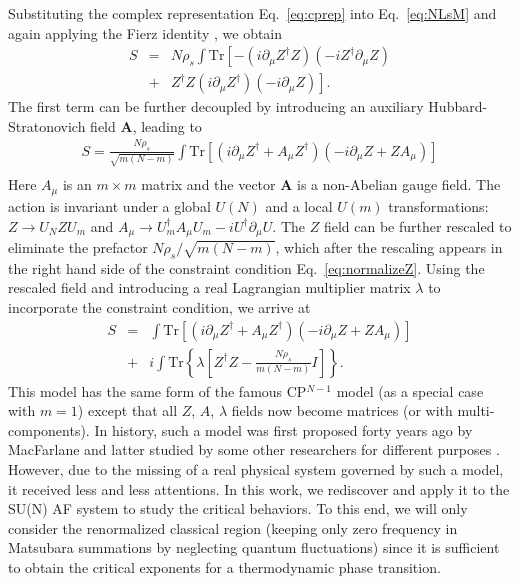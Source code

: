 \documentclass[aps,twocolumn,superscriptaddress]{revtex4-1}
\newcommand{\bea}{\begin{eqnarray}}
\newcommand{\eea}{\end{eqnarray}}
\newcommand{\bA}{\mathbf{A}}
\begin{document}
Substituting the complex representation Eq.~\ref{eq:cprep} into Eq.~\ref{eq:NLsM} and again applying the Fierz identity
, we obtain \bea S &=& N\rho_s \int\mathrm{Tr}\left[-(i\partial_\mu Z^\dagger Z) (-iZ^\dag \partial_\mu
Z) \right. \nonumber\\  &+& \left. Z^\dag Z (i\partial_\mu Z^\dagger)(-i\partial_\mu Z)\right] .\eea The first term can
be further decoupled by introducing an auxiliary Hubbard-Stratonovich field $\bA$, leading to \bea \label{eq:cpNm0} S=\frac{N\rho_s}{\sqrt{m(N-m)}}\int
\mathrm{Tr}\left[ (i\partial_\mu Z^\dag+A_\mu Z^\dag)(-i\partial_\mu Z+ZA_\mu)  \right] \nonumber\\ \eea 
Here $A_\mu$ is an $m\times m$ matrix and the vector $\bA$ is a non-Abelian gauge field. The action is invariant under a global $U(N)$ and a local $U(m)$ transformations: $Z\rightarrow U_NZU_m$ and $A_\mu\rightarrow U_m^\dag A_\mu U_m-iU^\dag\partial_\mu U$. \cite{macfarlane1979,duerksen1981}
The $Z$ field can be further rescaled to eliminate the prefactor
$N\rho_s/\sqrt{m(N-m)}$, which after the rescaling appears in the right hand side of the constraint condition Eq.~\ref{eq:normalizeZ}. Using the
rescaled field and introducing a real Lagrangian multiplier matrix $\lambda$ to incorporate the constraint condition, we
arrive at \bea \label{eq:cpNm} S&=&\int \mathrm{Tr}\left[ (i\partial_\mu Z^\dag+A_\mu Z^\dag)(-i\partial_\mu Z+ZA_\mu)
\right] \nonumber \\ &+& i\int \mathrm{Tr}\left\{\lambda\left[Z^\dag Z-\frac{N\rho_s}{m(N-m)}I\right]\right\} .
\eea 
This model has the same form of the famous CP$^{N-1}$ model (as a special case with $m=1$) except that all $Z$, $A$, $\lambda$ fields now become matrices (or with multi-components). 
In history, such a model was first proposed forty
years ago by MacFarlane \cite{macfarlane1979} and latter studied by some other researchers for different purposes
\cite{hikami1980,duerksen1981,maharana1983}. However, due to the missing of a real physical system governed by such a
model, it received less and less attentions. In this work, we rediscover and apply it to the SU(N) AF system to study
the critical behaviors. To this end, we will only consider the renormalized classical region (keeping only zero frequency in Matsubara summations by neglecting quantum fluctuations) since it is sufficient to obtain the critical exponents for a thermodynamic phase transition. \cite{chubukov1994,starykh1994,irkhin1996}
\end{document}

